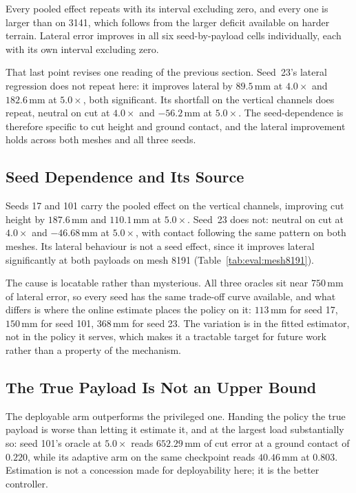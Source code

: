 Every pooled effect repeats with its interval excluding zero, and every one is
larger than on 3141, which follows from the larger deficit available on harder
terrain. Lateral error improves in all six seed-by-payload cells individually,
each with its own interval excluding zero.

That last point revises one reading of the previous section. Seed~23's lateral
regression does not repeat here: it improves lateral by $89.5$\,mm at
$4.0\times$ and $182.6$\,mm at $5.0\times$, both significant. Its shortfall on
the vertical channels does repeat, neutral on cut at $4.0\times$ and
$-56.2$\,mm at $5.0\times$. The seed-dependence is therefore specific to cut
height and ground contact, and the lateral improvement holds across both meshes
and all three seeds.

\subsection{Seed Dependence and Its Source}

Seeds 17 and 101 carry the pooled effect on the vertical channels, improving
cut height by $187.6\,$mm and $110.1\,$mm at $5.0\times$. Seed~23 does not:
neutral on cut at $4.0\times$ and $-46.68\,$mm at $5.0\times$, with contact
following the same pattern on both meshes. Its lateral behaviour is not a
seed effect, since it improves lateral significantly at both payloads on mesh
8191 (Table~\ref{tab:eval:mesh8191}).

The cause is locatable rather than mysterious. All three oracles sit near
$750\,$mm of lateral error, so every seed has the same trade-off curve
available, and what differs is where the online estimate places the policy on
it: $113\,$mm for seed 17, $150\,$mm for seed 101, $368\,$mm for seed 23. The
variation is in the fitted estimator, not in the policy it serves, which makes
it a tractable target for future work rather than a property of the
mechanism.

\subsection{The True Payload Is Not an Upper Bound}

The deployable arm outperforms the privileged one. Handing the policy the true
payload is worse than letting it estimate it, and at the largest load
substantially so: seed 101's oracle at $5.0\times$ reads $652.29\,$mm of cut
error at a ground contact of $0.220$, while its adaptive arm on the same
checkpoint reads $40.46\,$mm at $0.803$. Estimation is not a concession made for
deployability here; it is the better controller.

